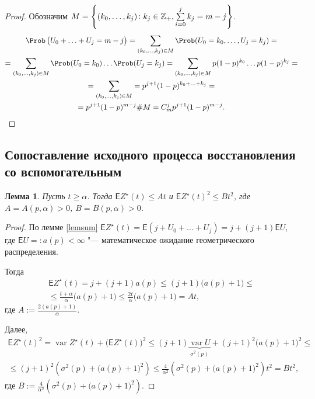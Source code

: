 \documentclass[a4paper]{article}
\newcommand{\Expect}{\mathsf{E}}
\newcommand{\nonneg}{\ensuremath\mathbb Z_+}
\DeclareMathOperator{\var}{\mathrm var}
\theoremstyle{plain}
\newtheorem{lem}[thm]{Лемма}
\theoremstyle{definition}
\theoremstyle{remark}
\begin{document}
\begin{proof}
   Обозначим $M = \left\{ (k_0, \ldots, k_j)\colon k_j \in \nonneg, \sum\limits_{i = 0}^j k_j = m - j\right\}$.
  \begin{multline*}
    \Prob\left( U_0 + \ldots + U_j = m - j\right) = \sum_{(k_0, \ldots, k_j) \in M} \Prob(U_0 = k_0, \ldots, U_j = k_j) =\\
    = \sum_{(k_0, \ldots, k_j) \in M} \Prob(U_0 = k_0)\ldots \Prob(U_j = k_j) = \sum_{(k_0, \ldots, k_j) \in M} p (1 - p)^{k_0}\ldots p (1 - p)^{k_j} =\\
    = \sum_{(k_0, \ldots, k_j) \in M} = p^{j + 1} (1 - p)^{k_0 + \ldots + k_j} =\\
    = p^{j + 1} (1 - p)^{m - j} \#M = C_m^j p^{j + 1} (1 - p)^{m - j}.
  \end{multline*}
\end{proof}

\subsection{Сопоставление исходного процесса восстановления со вспомогательным}

\begin{lem}\label{est}
  Пусть $t \geqslant \alpha$. Тогда $\Expect Z^\star(t) \leqslant At$ и $\Expect Z^\star(t)^2 \leqslant B t^2$, где $A = A(p, \alpha) > 0$, $B = B(p, \alpha) > 0$.
\end{lem}

\begin{proof}
  По лемме \ref{lemsum} $\Expect Z^\star(t) = \Expect(j + U_0 + \ldots + U_j) = j + (j + 1) \Expect U$, где $\Expect U =: a(p) < \infty$ "--- математическое ожидание геометрического распределения.

  Тогда
  \begin{multline*}
    \Expect Z^\star(t) = j + (j + 1) a(p) \leqslant (j + 1) \big(a(p) + 1\big) \leqslant\\
    \leqslant \frac{t + \alpha}{\alpha} \big(a(p) + 1\big) \leqslant \frac{2 t}{\alpha} \big( a(p) + 1 \big) = A t,
  \end{multline*}
  где $A := \frac{2 (a(p) + 1)}{\alpha}$.

  Далее,
  \begin{multline*}
    \Expect Z^\star(t)^2 = \var Z^\star(t) + \big(\Expect Z^\star(t) \big)^2 \leqslant (j + 1) \underbrace{\var U}_{\sigma^2(p)} + (j + 1)^2 \big( a(p) + 1 \big)^2 \leqslant\\
    \leqslant (j + 1)^2 \left( \sigma^2(p) + \big( a(p) + 1 \big)^2 \right) \leqslant \frac{4}{\alpha^2} \left( \sigma^2(p) + \big( a(p) + 1 \big)^2 \right) t^2 = B t^2,
  \end{multline*}
  где $B := \frac{4}{\alpha^2} \left( \sigma^2(p) + \big( a(p) + 1 \big)^2 \right)$.
\end{proof}
\end{document}
